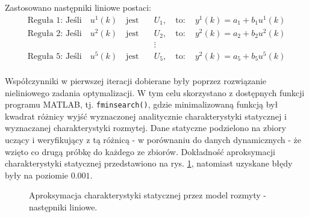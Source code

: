 \noindent Zastosowano następniki liniowe postaci:
\begin{equation}
\begin{aligned}
\text{Reguła 1: Jeśli} \quad u^1(k) \quad \text{jest} \quad &U_1, \quad \text{to}: \quad y^1(k) = a_1 + b_1 u^1(k) \\
\text{Reguła 2: Jeśli} \quad u^2(k) \quad \text{jest} \quad &U_2, \quad \text{to}: \quad y^2(k) = a_2 + b_2 u^2(k) \\ 
&\vdots \\
\text{Reguła 5: Jeśli} \quad u^5(k) \quad \text{jest} \quad &U_5, \quad \text{to}: \quad y^2(k) = a_5 + b_5 u^5(k) \\
\end{aligned}
\label{nastepniki_lin}
\end{equation}

Współczynniki w pierwszej iteracji dobierane były poprzez rozwiązanie nieliniowego zadania optymalizacji. W tym celu skorzystano z dostępnych funkcji programu MATLAB, tj. \verb+fminsearch()+, gdzie minimalizowaną funkcją był kwadrat różnicy wyjść wyznaczonej analitycznie charakterystyki statycznej i wyznaczanej charakterystyki rozmytej. Dane statyczne podzielono na zbiory uczący i weryfikujący z tą różnicą - w porównaniu do danych dynamicznych - że wzięto co drugą próbkę do każdego ze zbiorów. Dokładność aproksymacji charakterystyki statycznej przedstawiono na rys. \ref{static_hamm}, natomiast uzyskane błędy były na poziomie $\num{0.001}$. 

\begin{figure}[h!]
\centering
{}
\hfill
{}
\caption{Aproksymacja charakterystyki statycznej przez model rozmyty - następniki liniowe.}
\label{static_hamm}
\end{figure}

